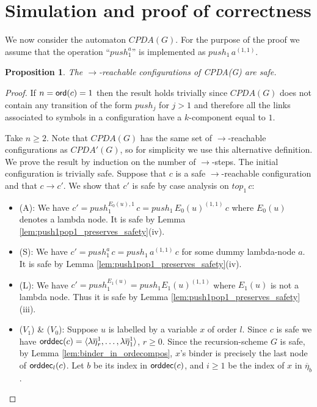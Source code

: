\documentclass[a4paper,draft]{article}
\newtheorem{proposition}{Proposition}[section]
\theoremstyle{remark}
\theoremstyle{definition}
\newcommand\orddec{{\sf orddec}}
\begin{document}
\section{Simulation and proof of correctness}
We now consider the automaton $CPDA(G)$. For the purpose of the proof we assume that 
the operation ``$push_1^a$'' is implemented as $push_1\,a^{(1,1)}$.
\begin{proposition}
The $\rightarrow$-reachable configurations of CPDA(G) are safe.
\end{proposition}
\begin{proof}
If $n ={\sf ord}(c) =1$ then the result holds trivially since $CPDA(G)$ does not contain
any transition of the form $push_j$ for $j>1$ and therefore all the links associated to symbols in a configuration have a $k$-component equal to $1$.

Take $n\geq 2$. Note that $CPDA(G)$ has the same set of $\rightarrow$-reachable configurations
as $CPDA'(G)$, so for simplicity we use this alternative definition. We prove the result by induction on the number of
$\rightarrow$-steps. The initial configuration is trivially safe.
Suppose that $c$ is a safe $\rightarrow$-reachable configuration and that
$c \rightarrow c'$.
We show that $c'$ is safe by case analysis on $top_1\,c$:
\begin{itemize}
\item (A): We have $c'=push_1^{E_0(u),1}\,c =push_1\,E_0(u)^{(1,1)}\,c$ where $E_0(u)$ denotes a lambda node. It is safe by Lemma \ref{lem:push1pop1_preserves_safety}(iv).

\item (S):
We have $c' = push_1^{a}\,c = push_1\,a^{(1,1)}\,c$ for some dummy lambda-node $a$. It is safe by Lemma \ref{lem:push1pop1_preserves_safety}(iv).

\item (L): We have $c' = push_1^{E_1(u)} = push_1 E_1(u)^{(1,1)}$ 
where $E_1(u)$ is not a lambda node. Thus it is safe by Lemma \ref{lem:push1pop1_preserves_safety}(iii).

\item ($V_1$) \& ($V_0$): Suppose $u$ is labelled by a variable $x$ of order $l$.
Since $c$ is safe we have $\orddec(c) = \langle \lambda\overline\eta_r^1 , \ldots, \lambda\overline\eta_1^1
\rangle$, $r\geq 0$. Since the recursion-scheme $G$ is safe, by Lemma \ref{lem:binder_in_ordecompos}, $x$'s binder is precisely the last node of $\orddec_l(c)$. Let $b$ be its index in $\orddec(c)$, and $i\geq 1$ be the index of $x$ 
in $\overline\eta_b$.



\end{itemize}
\end{proof}
\end{document}
